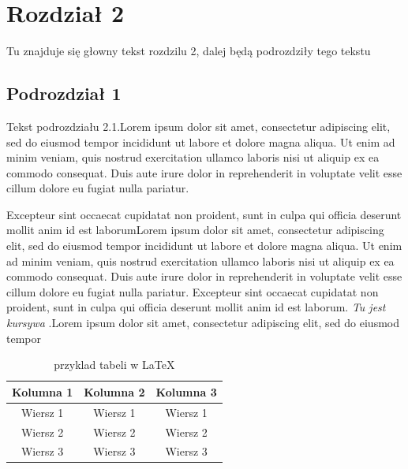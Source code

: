 \documentclass[12pt,a4paper,titlepage]{article}
\begin{document}
\section{Rozdział 2}

Tu znajduje się głowny tekst rozdzilu 2, dalej będą podrozdziły tego tekstu

\subsection{Podrozdział 1}

Tekst podrozdziału 2.1.Lorem ipsum dolor sit amet, consectetur adipiscing elit, sed do eiusmod tempor incididunt ut labore et dolore magna aliqua. Ut enim ad minim veniam, quis nostrud exercitation ullamco laboris nisi ut aliquip ex ea commodo consequat. Duis aute irure dolor in reprehenderit in voluptate velit esse cillum dolore eu fugiat nulla pariatur. \par Excepteur sint occaecat cupidatat non proident, sunt in culpa qui officia deserunt mollit anim id est laborumLorem ipsum dolor sit amet, consectetur adipiscing elit, sed do eiusmod tempor incididunt ut labore et dolore magna aliqua.  Ut enim ad minim veniam, quis nostrud exercitation ullamco laboris nisi ut aliquip ex ea commodo consequat. Duis aute irure dolor in reprehenderit in voluptate velit esse cillum dolore eu fugiat nulla pariatur. Excepteur sint occaecat cupidatat non proident, sunt in culpa qui officia deserunt mollit anim id est laborum.  \textit{Tu jest kursywa} .Lorem ipsum dolor sit amet, consectetur adipiscing elit, sed do eiusmod tempor 


\begin{table}[h]
\centering
\begin{tabular}{|c c c|}
\hline
Kolumna 1 & Kolumna 2 & Kolumna 3 \\
\hline
Wiersz 1 & Wiersz 1 & Wiersz 1 \\ \hline
Wiersz 2 & Wiersz 2 & Wiersz 2 \\ \hline
Wiersz 3 & Wiersz 3 & Wiersz 3 \\ 
\hline
\end{tabular}
\caption{przyklad tabeli w \LaTeX{}}
\label{tab:tabelka1}
\end{table}
\end{document}
